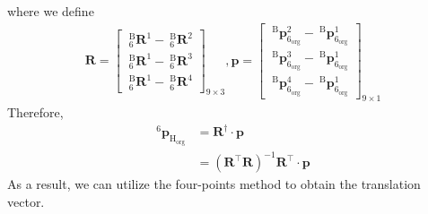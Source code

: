 where we define
\begin{equation*}
\begin{split}
\mathbf{R} =  
\begin{bmatrix}
\  _{\mathrm{6}}^{\mathrm{B}}\mathbf{R}^{1} - \  _{\mathrm{6}}^{\mathrm{B}}\mathbf{R}^{2}\\ 
\  _{\mathrm{6}}^{\mathrm{B}}\mathbf{R}^{1} - \  _{\mathrm{6}}^{\mathrm{B}}\mathbf{R}^{3}\\ 
\  _{\mathrm{6}}^{\mathrm{B}}\mathbf{R}^{1} - \  _{\mathrm{6}}^{\mathrm{B}}\mathbf{R}^{4}
\end{bmatrix}_{9 \times 3}, 
\boldsymbol{p} = 
\begin{bmatrix}
\ ^\mathrm{B}\!\boldsymbol{p}_\mathrm{6_{org}}^{2} -\ ^\mathrm{B}\!\boldsymbol{p}_\mathrm{6_{org}}^{1} \\ 
\ ^\mathrm{B}\!\boldsymbol{p}_\mathrm{6_{org}}^{3} -\ ^\mathrm{B}\!\boldsymbol{p}_\mathrm{6_{org}}^{1} \\ 
\ ^\mathrm{B}\!\boldsymbol{p}_\mathrm{6_{org}}^{4} -\ ^\mathrm{B}\!\boldsymbol{p}_\mathrm{6_{org}}^{1} 
\end{bmatrix}_{9 \times 1}
\end{split}
\end{equation*}
Therefore,
\begin{equation*}
\begin{split}
^\mathrm{6}\!\boldsymbol{p}_\mathrm{H_{org}} 	&= \mathbf{R}^{\dagger} \cdot \boldsymbol{p}\\
					  							&= \left( \mathbf{R}^\top\mathbf{R}\right) ^{-1}\mathbf{R}^\top \cdot \boldsymbol{p}
\end{split}
\end{equation*}
As a result, we can utilize the four-points method to obtain the translation vector.
